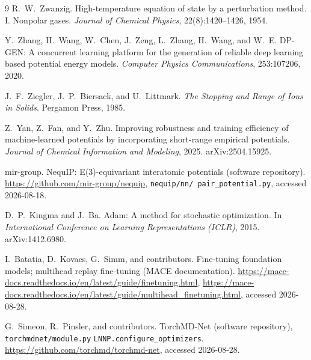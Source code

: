 \documentclass[11pt]{article}
\begin{document}
\begin{thebibliography}{9}
R.~W.~Zwanzig.
\newblock High-temperature equation of state by a perturbation method. I.
Nonpolar gases.
\newblock \emph{Journal of Chemical Physics}, 22(8):1420--1426, 1954.

Y.~Zhang, H.~Wang, W.~Chen, J.~Zeng, L.~Zhang, H.~Wang, and W.~E.
\newblock DP-GEN: A concurrent learning platform for the generation of
reliable deep learning based potential energy models.
\newblock \emph{Computer Physics Communications}, 253:107206, 2020.

J.~F.~Ziegler, J.~P.~Biersack, and U.~Littmark.
\newblock \emph{The Stopping and Range of Ions in Solids}.
\newblock Pergamon Press, 1985.

Z.~Yan, Z.~Fan, and Y.~Zhu.
\newblock Improving robustness and training efficiency of machine-learned
potentials by incorporating short-range empirical potentials.
\newblock \emph{Journal of Chemical Information and Modeling}, 2025.
\newblock arXiv:2504.15925.

mir-group.
\newblock NequIP: E(3)-equivariant interatomic potentials (software
repository).
\newblock \url{https://github.com/mir-group/nequip}, \texttt{nequip/nn/
pair\_potential.py}, accessed 2026-08-18.

D.~P.~Kingma and J.~Ba.
\newblock Adam: A method for stochastic optimization.
\newblock In \emph{International Conference on Learning Representations
(ICLR)}, 2015.
\newblock arXiv:1412.6980.

I.~Batatia, D.~Kovacs, G.~Simm, and contributors.
\newblock Fine-tuning foundation models; multihead replay fine-tuning
(MACE documentation).
\newblock \url{https://mace-docs.readthedocs.io/en/latest/guide/finetuning.html},
\url{https://mace-docs.readthedocs.io/en/latest/guide/multihead_finetuning.html},
accessed 2026-08-28.

G.~Simeon, R.~Pinsler, and contributors.
\newblock TorchMD-Net (software repository), \texttt{torchmdnet/module.py}
\texttt{LNNP.configure\_optimizers}.
\newblock \url{https://github.com/torchmd/torchmd-net}, accessed 2026-08-28.

\end{thebibliography}
\end{document}
